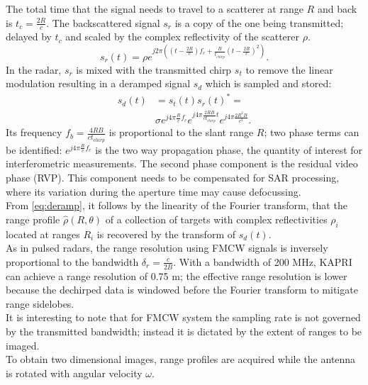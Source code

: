 The total time that the signal needs to travel to a scatterer at range $R$ and back is $t_{c} = \frac{2 R}{c}$. The backscattered signal $s_r$ is a copy of the one being transmitted; delayed by $t_{c}$ and scaled by the complex reflectivity of the scatterer $\rho$.
\begin{equation}
		s_r\left(t\right) = \rho e^{j 2 \pi \left( \left(t - \frac{2 R}{c}\right) f_{c} +  \frac{B}{t_{chirp}} \left(t - \frac{2 R}{c}\right)^2 \right)}.
\end{equation}
In the radar, $s_r$ is mixed with the transmitted chirp $s_t$  to remove the linear modulation resulting in a deramped signal $s_d$ which is sampled and stored: 
\begin{equation}\label{eq:deramp}
	\begin{aligned}
	s_{d}\left(t\right) &=s_t\left(t\right)s_r\left(t\right)^* =\\ 
	&\sigma e^{j 4 \pi \frac{ R}{c}f_c}  e^{j 4 \pi \frac{2 R B }{c t_{chirp}} t}  e^{j 4 \pi \frac{2 R^2 B}{c^2}}.
	\end{aligned}
\end{equation} 
Its frequency $f_{b} = \frac{4 R B}{c t_{chirp}}$ is proportional to the slant range $R$;
two phase terms can be identified: $ e^{j 4 \pi \frac{R}{c}f_c}$ is the two way propagation phase, the quantity of interest for  interferometric measurements. The second phase component is the residual video phase (RVP). This component needs to be compensated for SAR processing, where its variation during the aperture time may cause defocussing.\\
From \autoref{eq:deramp}, it follows by the linearity of the Fourier transform, that the range profile $\hat{\rho}\left(R, \theta\right)$ of a collection of targets with complex reflectivities $\rho_i$ located at ranges $R_{i}$ is recovered by the transform of $s_{d}\left(t\right)$.\\
As in pulsed radars, the range resolution using FMCW signals is inversely proportional to the bandwidth $\delta_{r} = \frac{c}{2 B}$. With a bandwidth of 200 MHz, KAPRI can achieve a range resolution of 0.75 m\cite{Strozzi2011}; the effective range resolution is lower because the dechirped data is windowed before the Fourier transform to mitigate range sidelobes.\\ It is interesting to note that for FMCW system the sampling rate is not governed by the transmitted bandwidth; instead it is dictated by the extent of ranges to be imaged\cite{Meta2006}.\\
To obtain two dimensional images, range profiles are acquired while the antenna is rotated with angular velocity $\omega$. 
